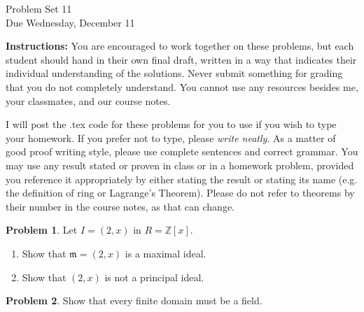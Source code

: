 \documentclass[11pt]{article}
\title{}
\date{\vspace{-0.5in}}
\newcommand{\ZZ}{\mathbb{Z}}
\theoremstyle{definition}
\newtheorem{problem}{Problem}
\begin{document}
\thispagestyle{fancy}
\pagestyle{fancy}

\vspace{3em}

\begin{center}
	{\LARGE Problem Set 11\\}
	Due Wednesday, December 11
\end{center}

\vspace{0.5em}

\noindent
{\bf Instructions:}
You are encouraged to work together on these problems, but each student should hand in their own final draft, written in a way that indicates their individual understanding of the solutions. Never submit something for grading that you do not completely understand. You cannot use any resources besides me, your classmates, and our course notes.


I will post the .tex code for these problems for you to use if you wish to type your homework. If you prefer not to type, please  {\em write neatly}. As a matter of good proof writing style, please use complete sentences and correct grammar. You may use any result  stated or proven in class or in a homework problem, provided you reference it appropriately by either stating the result or stating its name (e.g. the definition of ring or Lagrange's Theorem). Please do not refer to theorems by their number in the course notes, as that can change.


\vspace{2em}




\begin{problem}
	Let $I = (2,x)$ in $R = \ZZ[x]$.
	
	\vspace{-0.5em}
\begin{enumerate}[label=(5.\arabic*), itemsep=0.1em]
		\item Show that $\mathfrak{m} = (2, x)$ is a maximal ideal.
		
		\item Show that $(2,x)$ is not a principal ideal.		
\end{enumerate}
\end{problem}



\begin{problem}
	Show that every finite domain must be a field.
\end{problem}
\end{document}
